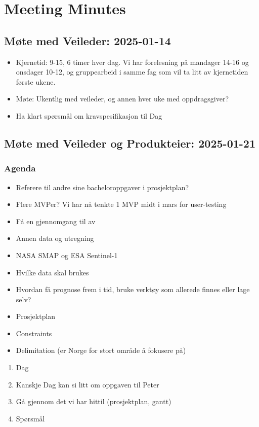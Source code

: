 \chapter{Meeting Minutes}
\label{appendix:meeting_minutes}
\section*{Møte med Veileder: 2025-01-14}
\begin{itemize}
\item
  Kjernetid: 9-15, 6 timer hver dag. Vi har forelesning på mandager
  14-16 og onsdager 10-12, og gruppearbeid i samme fag som vil ta litt
  av kjernetiden første ukene.
\item
  Møte: Ukentlig med veileder, og annen hver uke med oppdragsgiver?
\item
  Ha klart spørsmål om kravspesifikasjon til Dag
\end{itemize}

\section*{Møte med Veileder og
Produkteier: 2025-01-21}

\subsection*{Agenda}
\begin{itemize}
\item
  Referere til andre sine bacheloroppgaver i prosjektplan?
\item
  Flere MVPer? Vi har nå tenkte 1 MVP midt i mars for user-testing
\item
  Få en gjennomgang til av
\item
  Annen data og utregning
\item
  NASA SMAP og ESA Sentinel-1
\item
  Hvilke data skal brukes
\item
  Hvordan få prognose frem i tid, bruke verktøy som allerede finnes
  eller lage selv?
\item
  Prosjektplan
\item
  Constraints
\item
  Delimitation (er Norge for stort område å fokusere på)
\end{itemize}

\begin{enumerate}
\item
  Dag
\item
  Kanskje Dag kan si litt om oppgaven til Peter
\item
  Gå gjennom det vi har hittil (prosjektplan, gantt)
\item
  Spørsmål
\end{enumerate}

